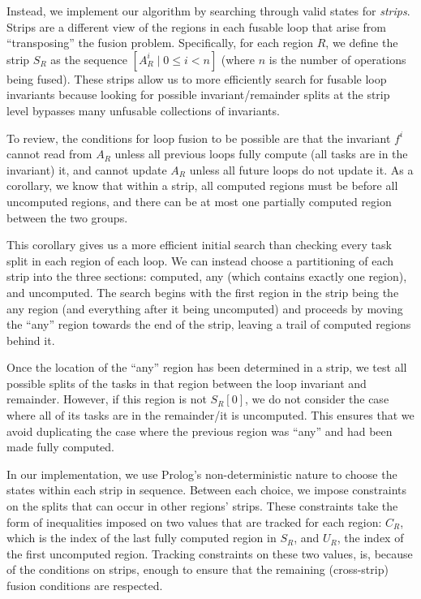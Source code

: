 \documentclass[12pt,letterpaper]{article}
\newcommand*{\opf}{f}
\begin{document}
Instead, we implement our algorithm by searching through valid states for \emph{strips}.
Strips are a different view of the regions in each fusable loop that arise from ``transposing'' the fusion problem.
Specifically, for each region $R$, we define the strip $S_R$ as the sequence $[A_R^i \mid 0 \leq i < n]$ (where $n$ is the number of operations being fused).
These strips allow us to more efficiently search for fusable loop invariants because looking for possible invariant/remainder splits at the strip level bypasses many unfusable collections of invariants.

To review, the conditions for loop fusion to be possible are that the invariant $\opf^i$ cannot read from $A_R$ unless all previous loops fully compute (all tasks are in the invariant) it, and cannot update $A_R$ unless all future loops do not update it.
As a corollary, we know that within a strip, all computed regions must be before all uncomputed regions, and there can be at most one partially computed region between the two groups.

This corollary gives us a more efficient initial search than checking every task split in each region of each loop.
We can instead choose a partitioning of each strip into the three sections: computed, any (which contains exactly one region), and uncomputed.
The search begins with the first region in the strip being the any region (and everything after it being uncomputed) and proceeds by moving the ``any'' region towards the end of the strip, leaving a trail of computed regions behind it.

Once the location of the ``any'' region has been determined in a strip, we test all possible splits of the tasks in that region between the loop invariant and remainder.
However, if this region is not $S_R[0]$, we do not consider the case where all of its tasks are in the remainder/it is uncomputed.
This ensures that we avoid duplicating the case where the previous region was ``any'' and had been made fully computed.

In our implementation, we use Prolog's non-deterministic nature to choose the states within each strip in sequence.
Between each choice, we impose constraints on the splits that can occur in other regions' strips.
These constraints take the form of inequalities imposed on two values that are tracked for each region: $C_R$, which is the index of the last fully computed region in $S_R$, and $U_R$, the index of the first uncomputed region.
Tracking constraints on these two values, is, because of the conditions on strips, enough to ensure that the remaining (cross-strip) fusion conditions are respected.
\end{document}
